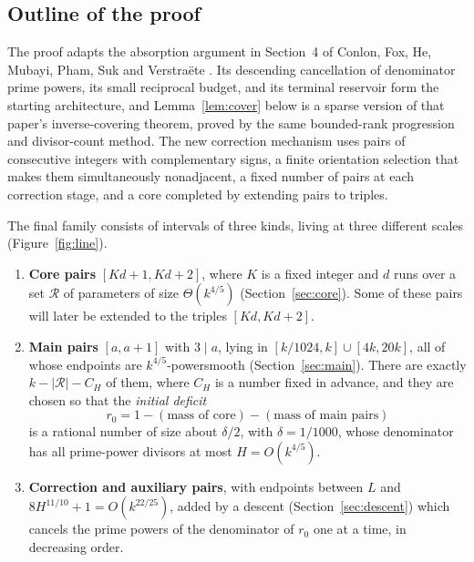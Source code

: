 \documentclass[11pt,letterpaper]{article}
\numberwithin{equation}{section}
\theoremstyle{plain}
\theoremstyle{remark}
\newcommand{\cR}{\mathcal R}
\begin{document}
\subsection{Outline of the proof}\label{sec:outline}

The proof adapts the absorption argument in Section~4 of Conlon, Fox, He, Mubayi, Pham, Suk and Verstra\"ete \cite{CFHMPSV}. Its descending cancellation of denominator prime powers, its small reciprocal budget, and its terminal reservoir form the starting architecture, and Lemma~\ref{lem:cover} below is a sparse version of that paper's inverse-covering theorem, proved by the same bounded-rank progression and divisor-count method. The new correction mechanism uses pairs of consecutive integers with complementary signs, a finite orientation selection that makes them simultaneously nonadjacent, a fixed number of pairs at each correction stage, and a core completed by extending pairs to triples.

The final family consists of intervals of three kinds, living at three different scales (Figure~\ref{fig:line}).

\begin{enumerate}
\item \textbf{Core pairs} $[Kd+1,Kd+2]$, where $K$ is a fixed integer and $d$ runs over a set $\cR$ of parameters of size $\Theta(k^{4/5})$ (Section~\ref{sec:core}). Some of these pairs will later be extended to the triples $[Kd,Kd+2]$.
\item \textbf{Main pairs} $[a,a+1]$ with $3\mid a$, lying in $[k/1024,k]\cup[4k,20k]$, all of whose endpoints are $k^{4/5}$-powersmooth (Section~\ref{sec:main}). There are exactly $k-|\cR|-C_H$ of them, where $C_H$ is a number fixed in advance, and they are chosen so that the \emph{initial deficit}
\[
r_0=1-(\text{mass of core})-(\text{mass of main pairs})
\]
is a rational number of size about $\delta/2$, with $\delta=1/1000$, whose denominator has all prime-power divisors at most $H=O(k^{4/5})$.
\item \textbf{Correction and auxiliary pairs}, with endpoints between $L$ and $8H^{11/10}+1=O(k^{22/25})$, added by a descent (Section~\ref{sec:descent}) which cancels the prime powers of the denominator of $r_0$ one at a time, in decreasing order.
\end{enumerate}
\end{document}
